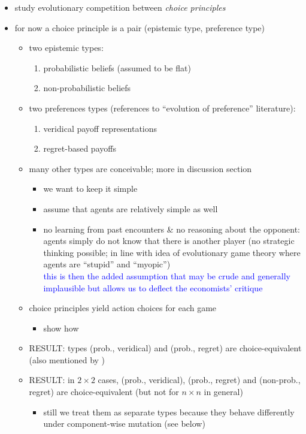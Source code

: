 \documentclass[fleqn,reqno,11pt]{article}
\begin{document}
\begin{itemize}
\item study evolutionary competition between \emph{choice principles} 
\item for now a choice principle is a pair (epistemic type, preference type)
  \begin{itemize}
  \item two epistemic types:
    \begin{enumerate}
    \item probabilistic beliefs (assumed to be flat)
    \item non-probabilistic beliefs
    \end{enumerate}
  \item two preferences types (references to ``evolution of preference'' literature):
    \begin{enumerate}
    \item veridical payoff representations
    \item regret-based payoffs
    \end{enumerate}
  \item many other types are conceivable; more in discussion section
    \begin{itemize}
    \item we want to keep it simple
    \item assume that agents are relatively simple as well
    \item no learning from past encounters \& no reasoning about the opponent: agents simply do
      not know that there is another player (no strategic thinking possible; in line with idea
      of evolutionary game theory where agents are ``stupid'' and ``myopic'') \\
      \textcolor{blue}{this is then the added assumption that may be crude and generally
        implausible but allows us to deflect the economists' critique}
    \end{itemize}
  \item choice principles yield action choices for each game
    \begin{itemize}
    \item show how
    \end{itemize}
  \item RESULT: types (prob., veridical) and (prob., regret) are choice-equivalent (also
    mentioned by \citet{HalpernPass2012:Iterated-Regret})
  \item RESULT: in $2 \times 2$ cases, (prob., veridical), (prob., regret) and (non-prob.,
    regret) are choice-equivalent (but not for $n \times n$ in general)
    \begin{itemize}
    \item still we treat them as separate types because they behave differently under
      component-wise mutation (see below)
    \end{itemize}
  \end{itemize}
\end{itemize}
\end{document}
